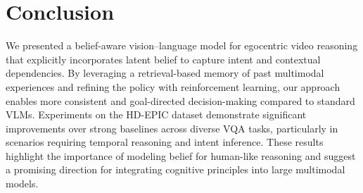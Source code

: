 \documentclass[letterpaper, 10 pt, conference]{ieeeconf}  %
\begin{document}













\section{Conclusion}

We presented a belief-aware vision--language model for egocentric video reasoning that explicitly incorporates latent belief to capture intent and contextual dependencies. By leveraging a retrieval-based memory of past multimodal experiences and refining the policy with reinforcement learning, our approach enables more consistent and goal-directed decision-making compared to standard VLMs. Experiments on the HD-EPIC dataset demonstrate significant improvements over strong baselines across diverse VQA tasks, particularly in scenarios requiring temporal reasoning and intent inference. These results highlight the importance of modeling belief for human-like reasoning and suggest a promising direction for integrating cognitive principles into large multimodal models.

\printbibliography
\end{document}
